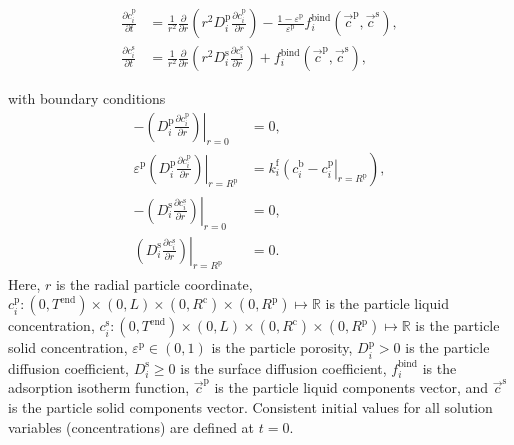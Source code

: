 \documentclass{article}
\begin{document}
\begin{align}
\frac{\partial c^{\mathrm{p}}_{i}}{\partial t} &= \frac{1}{r^2} \frac{\partial }{\partial r} \left( r^2 D_{i}^{\mathrm{p}} \frac{\partial c^{\mathrm{p}}_{i}}{\partial r} \right) - \frac{1 - \varepsilon^{\mathrm{p}}}{\varepsilon^{\mathrm{p}}}f^{\mathrm{bind}}_{i}\left( \vec{c}^{\mathrm{p}}, \vec{c}^{\mathrm{s}} \right) , \\
\frac{\partial c^{\mathrm{s}}_{i}}{\partial t} &=  \frac{1}{r^2} \frac{\partial }{\partial r} \left( r^2 D_{i}^{\mathrm{s}} \frac{\partial c^{\mathrm{s}}_{i}}{\partial r} \right)  + f^{\mathrm{bind}}_{i}\left( \vec{c}^{\mathrm{p}}, \vec{c}^{\mathrm{s}} \right) ,
\end{align}

with boundary conditions
\begin{align}
- \left. \left( D^{\mathrm{p}}_{i} \frac{\partial c^{\mathrm{p}}_{i}}{\partial r} \right) \right|_{r=0}
&= 0, \\
\varepsilon^{\mathrm{p}} \left. \left( D^{\mathrm{p}}_{i} \frac{\partial c^{\mathrm{p}}_{i}}{\partial r} \right)\right|_{r = R^{\mathrm{p}}_{}}
               &= k^{\mathrm{f}}_{i} \left. \left( c^{\mathrm{b}}_i - c^{\mathrm{p}}_{i} \right|_{r = R^{\mathrm{p}}_{}} \right),\\
-\left( \left. D^{\mathrm{s}}_{i} \frac{\partial c^{\mathrm{s}}_{i}}{\partial r} \right) \right|_{r=0}
&= 0, \\
\left( \left. D^{\mathrm{s}}_{i} \frac{\partial c^{\mathrm{s}}_{i}}{\partial r} \right) \right|_{r = R^{\mathrm{p}}_{}}
&= 0.
\end{align}
Here, $r$ is the radial particle coordinate, $c^{\mathrm{p}}_{i}\colon  (0, T^\mathrm{end}) \times (0, L)\times (0, R^\mathrm{c})\times (0, R^{\mathrm{p}}) \mapsto \mathbb{R}$ is the particle liquid concentration, $c^{\mathrm{s}}_{i}\colon  (0, T^\mathrm{end}) \times (0, L)\times (0, R^\mathrm{c})\times (0, R^{\mathrm{p}}) \mapsto \mathbb{R}$ is the particle solid concentration, $\varepsilon^{\mathrm{p}}\in (0, 1)$ is the particle porosity, $D^\mathrm{p}_{i}> 0$ is the particle diffusion coefficient, $D^\mathrm{s}_{i}\geq 0$ is the surface diffusion coefficient, $f^\mathrm{bind}_{i}$ is the adsorption isotherm function, $\vec{c}^\mathrm{p}$ is the particle liquid components vector, and $\vec{c}^\mathrm{s}$ is the particle solid components vector.
Consistent initial values for all solution variables (concentrations) are defined at $t = 0$.
\end{document}
